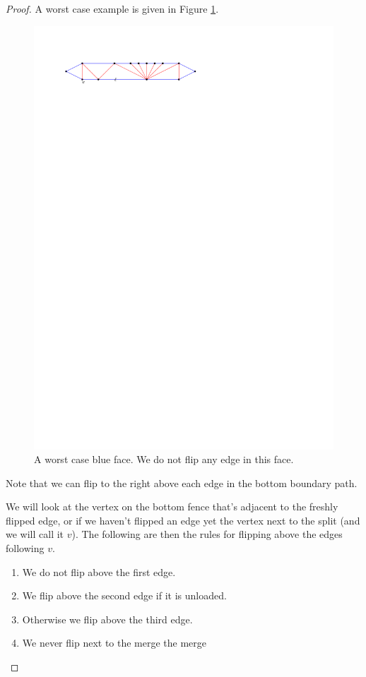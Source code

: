 \begin{proof}
  A worst case example is given in Figure \ref{fig:subdiv:worstCase}.

  \begin{figure}[h]
    \centering
    \includegraphics[scale=1]{blueFaceSubdivision/img/worstCase}
    \caption{A worst case blue face. We do not flip any edge in this face.}
    \label{fig:subdiv:worstCase}
  \end{figure}

  Note that we can flip to the right above each edge in the bottom boundary path.

  We will look at the vertex on the bottom fence that's adjacent to the freshly flipped edge, or if we haven't flipped an edge yet the vertex next to the split (and we will call it $v$). The following are then the rules for flipping above the edges following $v$.
  \begin{enumerate}
    \item We do not flip above the first edge.
    \item We flip above the second edge if it is unloaded.
    \item Otherwise we flip above the third edge.
    \item We never flip next to the merge the merge
  \end{enumerate}


\end{proof}

